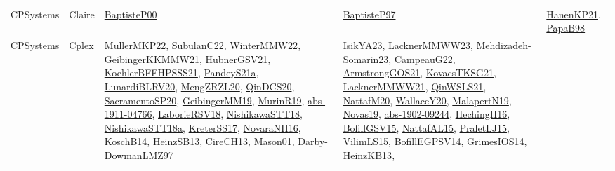 {\begin{longtable}{lp{3cm}>{\raggedright}p{6cm}>{\raggedright}p{6cm}p{8cm}}
CPSystems & Claire & \href{articles/BaptisteP00.pdf}{BaptisteP00}\cite{BaptisteP00} & \href{papers/BaptisteP97.pdf}{BaptisteP97}\cite{BaptisteP97} & \href{papers/HanenKP21.pdf}{HanenKP21}\cite{HanenKP21}, \href{articles/PapaB98.pdf}{PapaB98}\cite{PapaB98}\\
CPSystems & Cplex & \href{articles/MullerMKP22.pdf}{MullerMKP22}\cite{MullerMKP22}, \href{articles/SubulanC22.pdf}{SubulanC22}\cite{SubulanC22}, \href{papers/WinterMMW22.pdf}{WinterMMW22}\cite{WinterMMW22}, \href{papers/GeibingerKKMMW21.pdf}{GeibingerKKMMW21}\cite{GeibingerKKMMW21}, \href{articles/HubnerGSV21.pdf}{HubnerGSV21}\cite{HubnerGSV21}, \href{articles/KoehlerBFFHPSSS21.pdf}{KoehlerBFFHPSSS21}\cite{KoehlerBFFHPSSS21}, \href{articles/PandeyS21a.pdf}{PandeyS21a}\cite{PandeyS21a}, \href{articles/LunardiBLRV20.pdf}{LunardiBLRV20}\cite{LunardiBLRV20}, \href{articles/MengZRZL20.pdf}{MengZRZL20}\cite{MengZRZL20}, \href{articles/QinDCS20.pdf}{QinDCS20}\cite{QinDCS20}, \href{articles/SacramentoSP20.pdf}{SacramentoSP20}\cite{SacramentoSP20}, \href{papers/GeibingerMM19.pdf}{GeibingerMM19}\cite{GeibingerMM19}, \href{papers/MurinR19.pdf}{MurinR19}\cite{MurinR19}, \href{articles/abs-1911-04766.pdf}{abs-1911-04766}\cite{abs-1911-04766}, \href{articles/LaborieRSV18.pdf}{LaborieRSV18}\cite{LaborieRSV18}, \href{papers/NishikawaSTT18.pdf}{NishikawaSTT18}\cite{NishikawaSTT18}, \href{papers/NishikawaSTT18a.pdf}{NishikawaSTT18a}\cite{NishikawaSTT18a}, \href{articles/KreterSS17.pdf}{KreterSS17}\cite{KreterSS17}, \href{articles/NovaraNH16.pdf}{NovaraNH16}\cite{NovaraNH16}, \href{papers/KoschB14.pdf}{KoschB14}\cite{KoschB14}, \href{articles/HeinzSB13.pdf}{HeinzSB13}\cite{HeinzSB13}, \href{papers/CireCH13.pdf}{CireCH13}\cite{CireCH13}, \href{articles/Mason01.pdf}{Mason01}\cite{Mason01}, \href{articles/Darby-DowmanLMZ97.pdf}{Darby-DowmanLMZ97}\cite{Darby-DowmanLMZ97} & \href{articles/IsikYA23.pdf}{IsikYA23}\cite{IsikYA23}, \href{articles/LacknerMMWW23.pdf}{LacknerMMWW23}\cite{LacknerMMWW23}, \href{papers/Mehdizadeh-Somarin23.pdf}{Mehdizadeh-Somarin23}\cite{Mehdizadeh-Somarin23}, \href{articles/CampeauG22.pdf}{CampeauG22}\cite{CampeauG22}, \href{papers/ArmstrongGOS21.pdf}{ArmstrongGOS21}\cite{ArmstrongGOS21}, \href{papers/KovacsTKSG21.pdf}{KovacsTKSG21}\cite{KovacsTKSG21}, \href{papers/LacknerMMWW21.pdf}{LacknerMMWW21}\cite{LacknerMMWW21}, \href{articles/QinWSLS21.pdf}{QinWSLS21}\cite{QinWSLS21}, \href{papers/NattafM20.pdf}{NattafM20}\cite{NattafM20}, \href{articles/WallaceY20.pdf}{WallaceY20}\cite{WallaceY20}, \href{papers/MalapertN19.pdf}{MalapertN19}\cite{MalapertN19}, \href{articles/Novas19.pdf}{Novas19}\cite{Novas19}, \href{articles/abs-1902-09244.pdf}{abs-1902-09244}\cite{abs-1902-09244}, \href{papers/HechingH16.pdf}{HechingH16}\cite{HechingH16}, \href{papers/BofillGSV15.pdf}{BofillGSV15}\cite{BofillGSV15}, \href{articles/NattafAL15.pdf}{NattafAL15}\cite{NattafAL15}, \href{papers/PraletLJ15.pdf}{PraletLJ15}\cite{PraletLJ15}, \href{papers/VilimLS15.pdf}{VilimLS15}\cite{VilimLS15}, \href{papers/BofillEGPSV14.pdf}{BofillEGPSV14}\cite{BofillEGPSV14}, \href{articles/GrimesIOS14.pdf}{GrimesIOS14}\cite{GrimesIOS14}, \href{papers/HeinzKB13.pdf}{HeinzKB13}\cite{HeinzKB13}, 
\end{longtable}}
